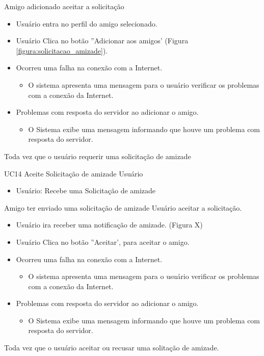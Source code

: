 {Amigo adicionado aceitar a solicitação}
{
\begin{itemize}
		\item Usuário entra no perfil do amigo selecionado.
		\item Usuário Clica no botão ''Adicionar aos amigos' (Figura 			 	\ref{figura:solicitacao_amizade}).	
\end{itemize}
}
{
\begin{itemize}
	\item Ocorreu uma falha na conexão com a Internet.
	\begin{itemize}
		\item O sistema apresenta uma mensagem para o usuário verificar os problemas com a conexão da Internet.
	\end{itemize}
	
	\item Problemas com resposta do servidor ao adicionar o amigo.
	\begin{itemize}
	\item O Sistema exibe uma mensagem informando que houve um problema com resposta do servidor.
	\end{itemize}

\end{itemize}
}
{Toda vez que o usuário requerir uma solicitação de amizade}
{
 
}
\casoDeUso
{UC14}
{Aceite Solicitação de amizade}
{Usuário}
{
\begin{itemize}
	\item Usuário: Recebe uma Solicitação de amizade
\end{itemize}

}
{Amigo ter enviado uma solicitação de amizade}
{Usuário aceitar a solicitação.}
{
\begin{itemize}
		\item Usuário ira receber uma notificação de amizade. (Figura X)
		\item Usuário Clica no botão ''Aceitar', para aceitar o amigo.
\end{itemize}
}
{
\begin{itemize}
	\item Ocorreu uma falha na conexão com a Internet.
	\begin{itemize}
		\item O sistema apresenta uma mensagem para o usuário verificar os problemas com a conexão da Internet.
	\end{itemize}
	
	\item Problemas com resposta do servidor ao adicionar o amigo.
	\begin{itemize}
	\item O Sistema exibe uma mensagem informando que houve um problema com resposta do servidor.
	\end{itemize}

\end{itemize}
}
{Toda vez que o usuário aceitar ou recusar uma solitação de amizade.}
{
 
}

